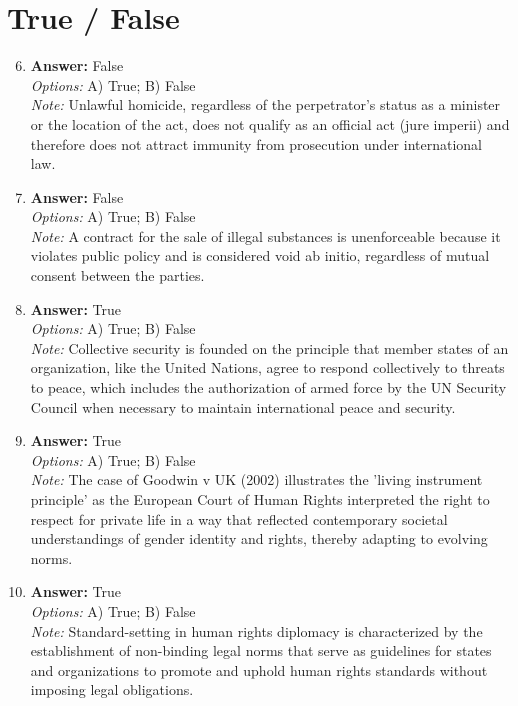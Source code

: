 \documentclass[12pt]{article}
\begin{document}
\section*{True / False}
\begin{enumerate}[label=\arabic*.]
\setcounter{enumi}{5}
\item \textbf{Answer:} False
\\ \textit{Options:} A) True; B) False
\\ \textit{Note:} Unlawful homicide, regardless of the perpetrator's status as a minister or the location of the act, does not qualify as an official act (jure imperii) and therefore does not attract immunity from prosecution under international law.
\item \textbf{Answer:} False
\\ \textit{Options:} A) True; B) False
\\ \textit{Note:} A contract for the sale of illegal substances is unenforceable because it violates public policy and is considered void ab initio, regardless of mutual consent between the parties.
\item \textbf{Answer:} True
\\ \textit{Options:} A) True; B) False
\\ \textit{Note:} Collective security is founded on the principle that member states of an organization, like the United Nations, agree to respond collectively to threats to peace, which includes the authorization of armed force by the UN Security Council when necessary to maintain international peace and security.
\item \textbf{Answer:} True
\\ \textit{Options:} A) True; B) False
\\ \textit{Note:} The case of Goodwin v UK (2002) illustrates the 'living instrument principle' as the European Court of Human Rights interpreted the right to respect for private life in a way that reflected contemporary societal understandings of gender identity and rights, thereby adapting to evolving norms.
\item \textbf{Answer:} True
\\ \textit{Options:} A) True; B) False
\\ \textit{Note:} Standard-setting in human rights diplomacy is characterized by the establishment of non-binding legal norms that serve as guidelines for states and organizations to promote and uphold human rights standards without imposing legal obligations.
\end{enumerate}
\end{document}

